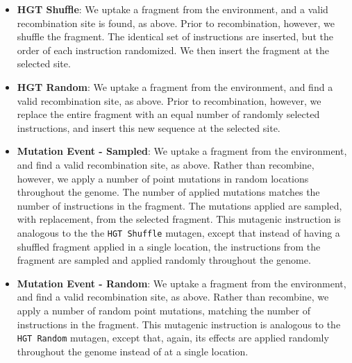 \documentclass[PhD]{msu-thesis}
\begin{document}
\begin{itemize}
	\item \textbf{HGT Shuffle}: We uptake a fragment from the environment, and a valid recombination site is found, as above.
Prior to recombination, however, we shuffle the fragment. The identical set of instructions are inserted, but the order of each instruction randomized. We then insert the fragment at the selected site.
	\item \textbf{HGT Random}: We uptake a fragment from the environment, and find a valid recombination site, as above. Prior to recombination, however, we replace the entire fragment with an equal number of randomly selected instructions, and insert this new sequence at the selected site.
	\item \textbf{Mutation Event - Sampled}: We uptake a fragment from the environment, and find a valid recombination site, as above. Rather than recombine, however, we apply a number of point mutations in random locations throughout the genome. The number of applied mutations matches the number of instructions in the fragment. The mutations applied are sampled, with replacement, from the selected fragment. This mutagenic instruction is analogous to the the \texttt{HGT Shuffle} mutagen, except that instead of having a shuffled fragment applied in a single location, the instructions from the fragment are sampled and applied randomly throughout the genome.

	\item \textbf{Mutation Event - Random}: We uptake a fragment from the environment, and find a valid recombination site, as above. Rather than recombine, we apply a number of random point mutations, matching the number of instructions in the fragment. This mutagenic instruction is analogous to the \texttt{HGT Random} mutagen, except that, again, its effects are applied randomly throughout the genome instead of at a single location.


\end{itemize}
\end{document}
